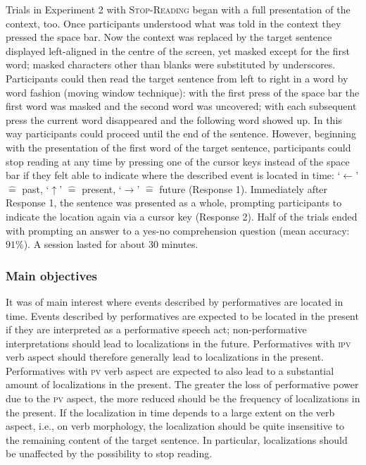 \documentclass[output=paper,
colorlinks,
citecolor=brown,
newtxmath,
hidelinks
]{langscibook}
\begin{document}
Trials in Experiment 2 with \textsc{Stop-Reading} began with a full presentation of the context, too. Once participants understood what was told in the context they pressed the space bar. Now the context was replaced by the target sentence displayed left-aligned in the centre of the screen, yet masked except for the first word; masked characters other than blanks were substituted by underscores. Participants could then read the target sentence from left to right in a word by word fashion (moving window technique): with the first press of the space bar the first word was masked and the second word was uncovered; with each subsequent press the current word disappeared and the following word showed up. In this way participants could proceed until the end of the sentence. However, beginning with the presentation of the first word of the target sentence, participants could stop reading at any time by pressing one of the cursor keys instead of the space bar if they felt able to indicate where the described event is located in time: ‘$\leftarrow$’ $\hat{=}$ past, ‘$\uparrow$’ $\hat{=}$ present, ‘$\rightarrow$’ $\hat{=}$ future (Response 1). Immediately after Response 1, the sentence was presented as a whole, prompting participants to indicate the location again via a cursor key (Response 2). Half of the trials ended with prompting an answer to a yes-no comprehension question (mean accuracy: $91\%$). A session lasted for about 30 minutes. 

\subsubsection{Main objectives}

It was of main interest where events described by performatives are located in time. Events described by performatives are expected to be located in the present if they are interpreted as a performative speech act; non-performative interpretations should lead to localizations in the future. Performatives with \textsc{ipv} verb aspect should therefore generally lead to localizations in the present. Performatives with \textsc{pv} verb aspect are expected to also lead to a substantial amount of localizations in the present. The greater the loss of performative power due to the \textsc{pv} aspect, the more reduced should be the frequency of localizations in the present. If the localization in time depends to a large extent on the verb aspect, i.e., on verb morphology, the localization should be quite insensitive to the remaining content of the target sentence. In particular, localizations should be unaffected by the possibility to stop reading.
\end{document}
